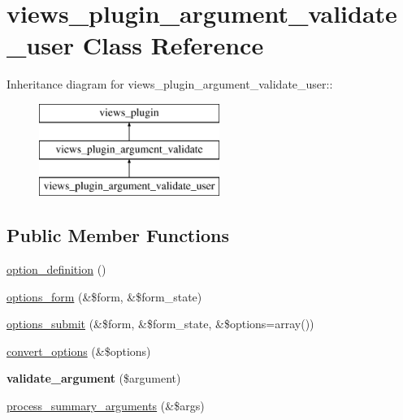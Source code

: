 \hypertarget{classviews__plugin__argument__validate__user}{
\section{views\_\-plugin\_\-argument\_\-validate\_\-user Class Reference}
\label{classviews__plugin__argument__validate__user}
}
Inheritance diagram for views\_\-plugin\_\-argument\_\-validate\_\-user::\begin{figure}[H]
\begin{center}
\leavevmode
\includegraphics[height=3cm]{classviews__plugin__argument__validate__user}
\end{center}
\end{figure}
\subsection*{Public Member Functions}
\begin{DoxyCompactItemize}
\item 
\hyperlink{classviews__plugin__argument__validate__user_a58ce7613662512981f4a6996c300fa07}{option\_\-definition} ()
\item 
\hyperlink{classviews__plugin__argument__validate__user_a63c0da1ae23df4d74b0e38e4e27f2bd7}{options\_\-form} (\&\$form, \&\$form\_\-state)
\item 
\hyperlink{classviews__plugin__argument__validate__user_afdcb2900871aef06cd2263afebabe99f}{options\_\-submit} (\&\$form, \&\$form\_\-state, \&\$options=array())
\item 
\hyperlink{classviews__plugin__argument__validate__user_a0e9153f6d0cfcd5f28854731d89cce0e}{convert\_\-options} (\&\$options)
\item 
\hypertarget{classviews__plugin__argument__validate__user_a8b23a8f950ffebc871d59318eb839888}{
{\bfseries validate\_\-argument} (\$argument)}
\label{classviews__plugin__argument__validate__user_a8b23a8f950ffebc871d59318eb839888}

\item 
\hyperlink{classviews__plugin__argument__validate__user_af49e3a8adbb930ba83d0343d7d12db0f}{process\_\-summary\_\-arguments} (\&\$args)
\end{DoxyCompactItemize}


